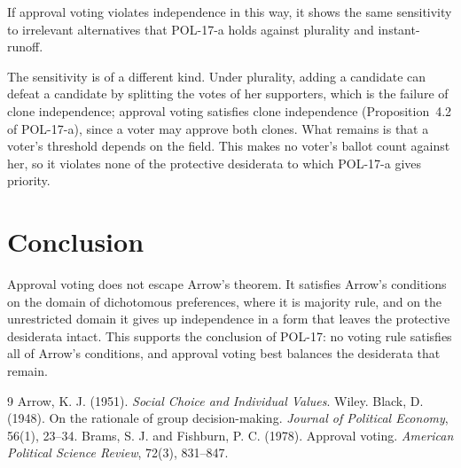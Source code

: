 \documentclass{situationist-preprint}
\begin{document}
\begin{objection}
If approval voting violates independence in this way, it shows the same sensitivity to irrelevant alternatives that POL-17-a holds against plurality and instant-runoff.
\end{objection}

\begin{reply}
The sensitivity is of a different kind. Under plurality, adding a candidate can defeat a candidate by splitting the votes of her supporters, which is the failure of clone independence; approval voting satisfies clone independence (Proposition~4.2 of POL-17-a), since a voter may approve both clones. What remains is that a voter's threshold depends on the field. This makes no voter's ballot count against her, so it violates none of the protective desiderata to which POL-17-a gives priority.
\end{reply}

\section{Conclusion}

Approval voting does not escape Arrow's theorem. It satisfies Arrow's conditions on the domain of dichotomous preferences, where it is majority rule, and on the unrestricted domain it gives up independence in a form that leaves the protective desiderata intact. This supports the conclusion of POL-17: no voting rule satisfies all of Arrow's conditions, and approval voting best balances the desiderata that remain.

\begin{thebibliography}{9}\small
{} Arrow, K. J. (1951). \emph{Social Choice and Individual Values}. Wiley.
 Black, D. (1948). On the rationale of group decision-making. \emph{Journal of Political Economy}, 56(1), 23--34.
 Brams, S. J. and Fishburn, P. C. (1978). Approval voting. \emph{American Political Science Review}, 72(3), 831--847.
\end{thebibliography}
\end{document}

